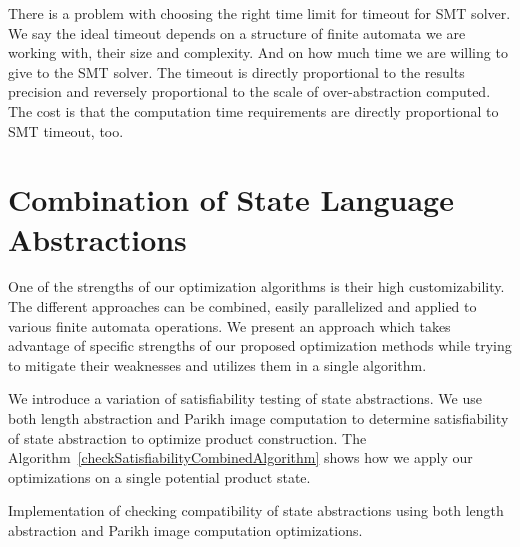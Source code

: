 There is a problem with choosing the right time limit for timeout for SMT solver. We say the ideal timeout depends on a structure of finite automata we are working with, their size and complexity. And on how much time we are willing to give to the SMT solver. The timeout is directly proportional to the results precision and reversely proportional to the scale of over-abstraction computed. The cost is that the computation time requirements are directly proportional to SMT timeout, too.


\section{Combination of State Language Abstractions}

One of the strengths of our optimization algorithms is their high customizability. The different approaches can be combined, easily parallelized and applied to various finite automata operations. We present an approach which takes advantage of specific strengths of our proposed optimization methods while trying to mitigate their weaknesses and utilizes them in a single algorithm.

We introduce a variation of satisfiability testing of state abstractions. We use both length abstraction and Parikh image computation to determine satisfiability of state abstraction to optimize product construction. The Algorithm~\ref{checkSatisfiabilityCombinedAlgorithm} shows how we apply our optimizations on a single potential product state.

\begin{algorithm}[ht]
\caption{Implementation of checking compatibility of state abstractions using both length abstraction and Parikh image computation optimizations.}\label{checkSatisfiabilityCombinedAlgorithm}



\DontPrintSemicolon

\end{algorithm}

